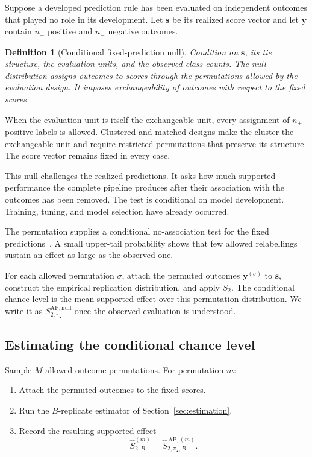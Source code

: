\documentclass[11pt]{article}
\newcommand{\SAPnull}{S_{2,\pi_\star}^{\mathrm{AP,null}}}
\newtheorem{definition}{Definition}
\theoremstyle{remark}
\begin{document}
Suppose a developed prediction rule has been evaluated on independent outcomes that played no role in its development. Let $\mathbf{s}$ be its realized score vector and let $\mathbf{y}$ contain $n_+$ positive and $n_-$ negative outcomes.

\begin{definition}[Conditional fixed-prediction null]
Condition on $\mathbf{s}$, its tie structure, the evaluation units, and the observed class counts. The null distribution assigns outcomes to scores through the permutations allowed by the evaluation design. It imposes exchangeability of outcomes with respect to the fixed scores.
\end{definition}

When the evaluation unit is itself the exchangeable unit, every assignment of $n_+$ positive labels is allowed. Clustered and matched designs make the cluster the exchangeable unit and require restricted permutations that preserve its structure. The score vector remains fixed in every case.

This null challenges the realized predictions. It asks how much supported performance the complete pipeline produces after their association with the outcomes has been removed. The test is conditional on model development. Training, tuning, and model selection have already occurred.

The permutation supplies a conditional no-association test for the fixed predictions~\cite{ojala2010permutation}. A small upper-tail probability shows that few allowed relabellings sustain an effect as large as the observed one.

For each allowed permutation $\sigma$, attach the permuted outcomes $\mathbf{y}^{(\sigma)}$ to $\mathbf{s}$, construct the empirical replication distribution, and apply $S_2$. The conditional chance level is the mean supported effect over this permutation distribution. We write it as $\SAPnull$ once the observed evaluation is understood.

\subsection{Estimating the conditional chance level}

Sample $M$ allowed outcome permutations. For permutation $m$:
\begin{enumerate}
\item Attach the permuted outcomes to the fixed scores.
\item Run the $B$-replicate estimator of Section~\ref{sec:estimation}.
\item Record the resulting supported effect
\[
\widehat S_{2,B}^{(m)}
=
\widehat S_{2,\pi_\star,B}^{\,\mathrm{AP},(m)}.
\]
\end{enumerate}
\end{document}
